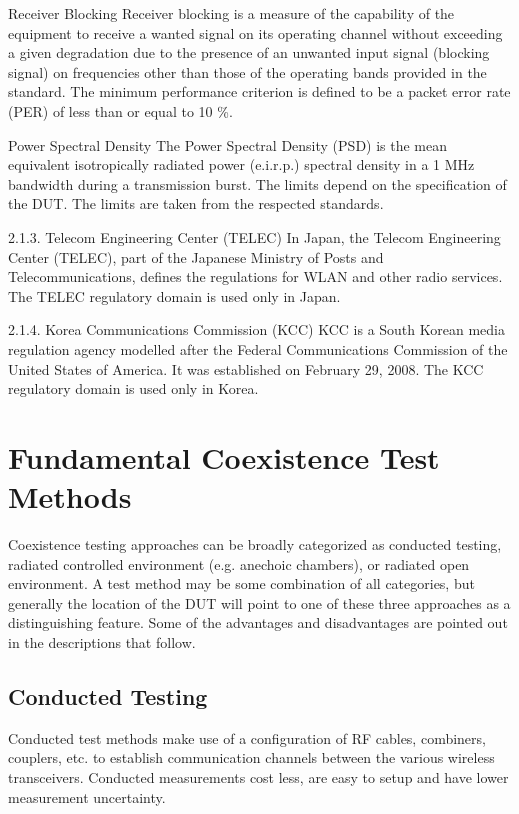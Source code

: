 Receiver Blocking
Receiver blocking is a measure of the capability of the equipment to receive a wanted signal on its operating channel without exceeding a given degradation due to the presence of an unwanted input signal (blocking signal) on frequencies other than those of the operating bands provided in the standard. The minimum performance criterion is defined to be a packet error rate (PER) of less than or equal to 10 \%.




Power Spectral Density
The Power Spectral Density (PSD) is the mean equivalent isotropically radiated power (e.i.r.p.) spectral density in a 1 MHz bandwidth during a transmission burst. The limits depend on the specification of the DUT. The limits are taken from the respected standards.



2.1.3. Telecom Engineering Center (TELEC)
In Japan, the Telecom Engineering Center (TELEC), part of the Japanese Ministry of Posts and Telecommunications, defines the regulations for WLAN and other radio services. The TELEC regulatory domain is used only in Japan.


2.1.4. Korea Communications Commission (KCC)
KCC is a South Korean media regulation agency modelled after the Federal Communications Commission of the United States of America. It was established on February 29, 2008. The KCC regulatory domain is used only in Korea.
 

\section{Fundamental Coexistence Test Methods}
Coexistence testing approaches can be broadly categorized as conducted testing, radiated controlled environment (e.g. anechoic chambers), or radiated open environment. A test method may be some combination of all categories, but generally the location of the DUT will point to one of these three approaches as a distinguishing feature. Some of the advantages and disadvantages are pointed out in the descriptions that follow. 

\subsection{Conducted Testing}
Conducted test methods make use of a configuration of RF cables, combiners, couplers, etc. to establish communication channels between the various wireless transceivers. Conducted measurements cost less, are easy to setup and have lower measurement uncertainty.

